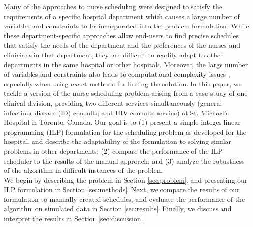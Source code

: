 
Many of the approaches to nurse scheduling were designed to satisfy the
requirements of a specific hospital department which causes a large number of
variables and constraints to be incorporated into the problem formulation. While
these department-specific approaches allow end-users to find precise schedules
that satisfy the needs of the department and the preferences of the nurses and
clinicians in that department, they are difficult to readily adapt to other
departments in the same hospital or other hospitals. %
Moreover, the large number of variables and constraints also leads to
computational complexity issues \cite{goos_complexity_1996}, especially when
using exact methods for finding the solution. In this paper, we tackle a version
of the nurse scheduling problem arising from a case study of one clinical
division, providing two different services simultaneously (general infectious
disease (ID) consults; and HIV consults service) at St. Michael's Hospital in
Toronto, Canada. Our goal is to (1) present a simple integer linear programming
(ILP) formulation for the scheduling problem as developed for the hospital, and
describe the adaptability of the formulation to solving similar problems in
other departments; (2) compare the performance of the ILP scheduler to the
results of the manual approach; and (3) analyze the robustness of the algorithm
in difficult instances of the problem. \\

We begin by describing the problem in Section \ref{sec:problem}, and presenting
our ILP formulation in Section \ref{sec:methods}. Next, we compare the results
of our formulation to manually-created schedules, and evaluate the performance
of the algorithm on simulated data in Section \ref{sec:results}. Finally, we
discuss and interpret the results in Section \ref{sec:discussion}. %
